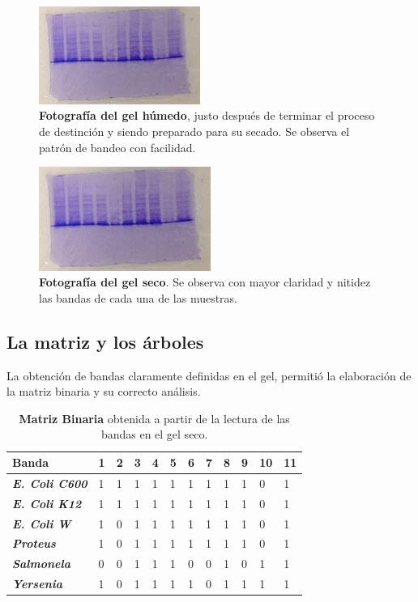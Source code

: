 \documentclass[%
 reprint,
 amsmath,amssymb,
 aps,
showkeys,
letter,
12pts
]{revtex4-1}
\begin{document}
		\begin{figure}
		\includegraphics[width=0.47\textwidth]{foto1.jpg}
		\caption{\textbf{Fotografía del gel húmedo}, justo después de terminar el proceso de destinción y siendo preparado para su secado. Se observa el patrón de bandeo con facilidad.}
		\label{Imagen:gelI}
		\end{figure} 
		
		\begin{figure}
		\includegraphics[width=0.5\textwidth]{foto1.jpg}
		\caption{\textbf{Fotografía del gel seco}. Se observa con mayor claridad y nitidez las bandas de cada una de las muestras.}
		\label{Imagen:gelII}
		\end{figure} 
	
	\subsection{La matriz y los árboles}
		La obtención de bandas claramente definidas en el gel, permitió la elaboración de la matriz binaria y su correcto análisis.
		\begin{table}[h!]
			\centering
			\large
			\caption{\textbf{Matriz Binaria} obtenida a partir de la lectura de las bandas en el gel seco.}
			\label{tabla:Matriz}
			\begin{tabular}{|l||l|l|l|l|l|l|l|l|l|l|l|}
			\hline		
			\textbf{Banda} & \textbf{1} & \textbf{2} & \textbf{3} & \textbf{4} & \textbf{5} & \textbf{6} & \textbf{7} & \textbf{8} & \textbf{9} & \textbf{10} & \textbf{11}\\ \hline \hline
			\textbf{\textit{E. Coli C600}} & 1 & 1 & 1 & 1 & 1 & 1 & 1 & 1 & 1 & 0 & 1\\ \hline
			\textbf{\textit{E. Coli K12}}  & 1 & 1 & 1 & 1 & 1 & 1 & 1 & 1 & 1 & 0 & 1\\ \hline
			\textbf{\textit{E. Coli W}}    & 1 & 0 & 1 & 1 & 1 & 1 & 1 & 1 & 1 & 0 & 1\\ \hline
			\textbf{\textit{Proteus}}      & 1 & 0 & 1 & 1 & 1 & 1 & 1 & 1 & 1 & 0 & 1\\ \hline
			\textbf{\textit{Salmonela}}    & 0 & 0 & 1 & 1 & 1 & 0 & 0 & 1 & 0 & 1 & 1\\ \hline
			\textbf{\textit{Yersenia}}     & 1 & 0 & 1 & 1 & 1 & 1 & 0 & 1 & 1 & 1 & 1\\ \hline
			\end{tabular}
		\end{table}	
		
\end{document}

